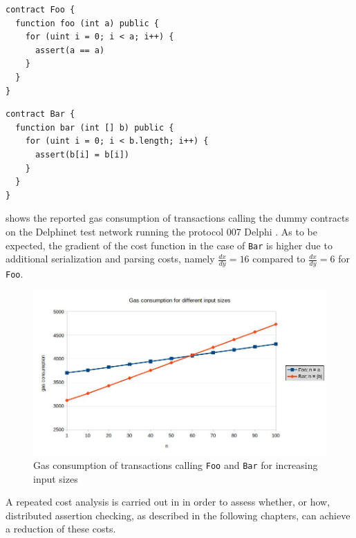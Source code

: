 \begin{lstlisting}[numbers=none, language=Solidity, caption=Simple dummy contract executing a loop]
contract Foo {
  function foo (int a) public {
    for (uint i = 0; i < a; i++) {
      assert(a == a)
    }
  }
}
\end{lstlisting}
\begin{lstlisting}[numbers=none, language=Solidity, caption=Simple dummy contract iterating over a list]
contract Bar {
  function bar (int [] b) public {
    for (uint i = 0; i < b.length; i++) {
      assert(b[i] = b[i])
    }
  }
}
\end{lstlisting}

 shows the reported gas consumption of transactions calling the dummy contracts on the Delphinet test network running the protocol 007 Delphi \cite{tezos_docs}. As to be expected, the gradient of the cost function in the case of \texttt{Bar} is higher due to additional serialization and parsing costs, namely $\frac{dx}{dy} = 16$ compared to $\frac{dx}{dy} = 6$ for \texttt{Foo}.

\begin{figure}[p]
\centering
\includegraphics[width=0.9\linewidth]{figures/2-use_cases/cost_analysis}
\caption{Gas consumption of transactions calling \texttt{Foo} and \texttt{Bar} for increasing input sizes}
\label{fig:use_case_cost}
\vspace{128in}
\end{figure}

A repeated cost analysis is carried out in  in order to assess whether, or how, distributed assertion checking, as described in the following chapters, can achieve a reduction of these costs.